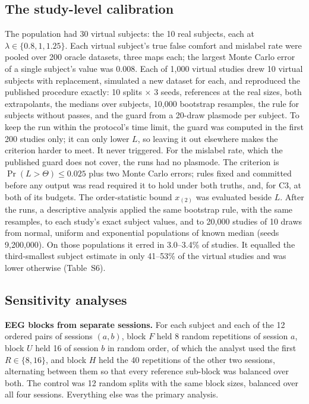 \documentclass[11pt]{article}
\newcommand{\LcRuleLo}{3.0}
\newcommand{\LcRuleHi}{3.4}
\newcommand{\LcThetaSeMax}{0.008}
\newcommand{\LcIsXthreeLo}{41}
\newcommand{\LcIsXthreeHi}{53}
\begin{document}
\subsection{The study-level calibration}
The population had 30 virtual subjects: the 10 real subjects, each at $\lambda\in\{0.8,1,1.25\}$.
Each virtual subject's true false comfort and mislabel rate were pooled over 200 oracle datasets, three maps each; the largest Monte Carlo error of a single subject's value was \LcThetaSeMax.
Each of 1{,}000 virtual studies drew 10 virtual subjects with replacement, simulated a new dataset for each, and reproduced the published procedure exactly: 10 splits $\times$ 3 seeds, references at the real sizes, both extrapolants, the medians over subjects, 10{,}000 bootstrap resamples, the rule for subjects without passes, and the guard from a 20-draw plasmode per subject.
To keep the run within the protocol's time limit, the guard was computed in the first 200 studies only; it can only lower $L$, so leaving it out elsewhere makes the criterion harder to meet.
It never triggered.
For the mislabel rate, which the published guard does not cover, the runs had no plasmode.
The criterion is $\Pr(L>\Theta)\le0.025$ plus two Monte Carlo errors; rules fixed and committed before any output was read required it to hold under both truths, and, for C3, at both of its budgets.
The order-statistic bound $x_{(2)}$ was evaluated beside $L$.
After the runs, a descriptive analysis applied the same bootstrap rule, with the same resamples, to each study's exact subject values, and to 20{,}000 studies of 10 draws from normal, uniform and exponential populations of known median (seeds 9{,}200{,}000).
On those populations it erred in \LcRuleLo--\LcRuleHi\% of studies.
It equalled the third-smallest subject estimate in only \LcIsXthreeLo--\LcIsXthreeHi\% of the virtual studies and was lower otherwise (Table~S6).

\subsection{Sensitivity analyses}
\textbf{EEG blocks from separate sessions.} For each subject and each of the 12 ordered pairs of sessions $(a,b)$, block $F$ held 8 random repetitions of session $a$, block $U$ held 16 of session $b$ in random order, of which the analyst used the first $R\in\{8,16\}$, and block $H$ held the 40 repetitions of the other two sessions, alternating between them so that every reference sub-block was balanced over both.
The control was 12 random splits with the same block sizes, balanced over all four sessions.
Everything else was the primary analysis.
\end{document}
